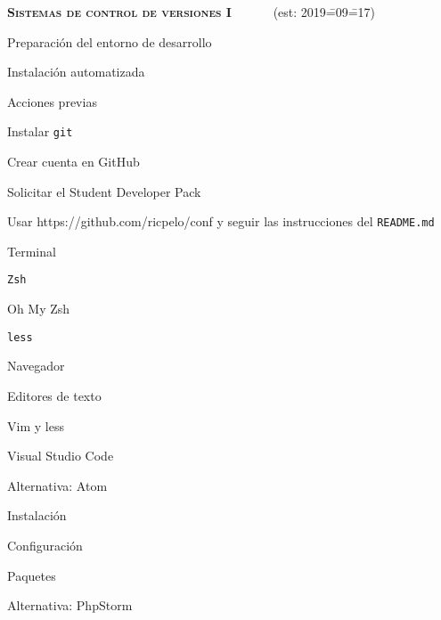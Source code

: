\begin{longenum}
    \item \textbf{\textsc{Sistemas de control de versiones I}} \ \ \ \ \ \ (est: 2019\==09\==17)
    \begin{longenum}
        \item Preparación del entorno de desarrollo
        \begin{longenum}
            \item Instalación automatizada
            \begin{longenum}
                \item Acciones previas
                \begin{longenum}
                    \item Instalar \texttt{git}
                    \item Crear cuenta en GitHub
                    \item Solicitar el Student Developer Pack
                \end{longenum}
                \item Usar https://github.com/ricpelo/conf y seguir las instrucciones del \texttt{README.md}
            \end{longenum}
            \item Terminal
            \begin{longenum}
                \item \texttt{Zsh}
                \item Oh My Zsh
                \item \texttt{less}
            \end{longenum}
            \item Navegador
            \item Editores de texto
            \begin{longenum}
                \item Vim y less
                \item Visual Studio Code
                \item Alternativa: Atom
                \begin{longenum}
                    \item Instalación
                    \item Configuración
                    \item Paquetes
                \end{longenum}
                \item Alternativa: PhpStorm

\end{longenum}
\end{longenum}
\end{longenum}
\end{longenum}
